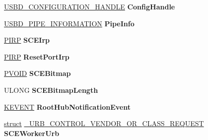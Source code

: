 \begin{DoxyCompactItemize}
\item 
\mbox{\label{struct___u_s_b_h_u_b___f_d_o___e_x_t_e_n_s_i_o_n_ab1c0ac7dc7bae4de4aabdfe5ae3b74e1}} 
\hyperlink{interfacevoid}{U\+S\+B\+D\+\_\+\+C\+O\+N\+F\+I\+G\+U\+R\+A\+T\+I\+O\+N\+\_\+\+H\+A\+N\+D\+LE} {\bfseries Config\+Handle}
\item 
\mbox{\label{struct___u_s_b_h_u_b___f_d_o___e_x_t_e_n_s_i_o_n_af53e676fd79ab3e45ddbbae993cc10d7}} 
\hyperlink{struct___u_s_b_d___p_i_p_e___i_n_f_o_r_m_a_t_i_o_n}{U\+S\+B\+D\+\_\+\+P\+I\+P\+E\+\_\+\+I\+N\+F\+O\+R\+M\+A\+T\+I\+ON} {\bfseries Pipe\+Info}
\item 
\mbox{\label{struct___u_s_b_h_u_b___f_d_o___e_x_t_e_n_s_i_o_n_a0b889f7984f1a51833e6a92f00398e81}} 
\hyperlink{interfacevoid}{P\+I\+RP} {\bfseries S\+C\+E\+Irp}
\item 
\mbox{\label{struct___u_s_b_h_u_b___f_d_o___e_x_t_e_n_s_i_o_n_abdd2cebbe3e6877b25b33815d009ee9e}} 
\hyperlink{interfacevoid}{P\+I\+RP} {\bfseries Reset\+Port\+Irp}
\item 
\mbox{\label{struct___u_s_b_h_u_b___f_d_o___e_x_t_e_n_s_i_o_n_aa9657367e0665ffd4ce06adcbb2d1fd1}} 
\hyperlink{interfacevoid}{P\+V\+O\+ID} {\bfseries S\+C\+E\+Bitmap}
\item 
\mbox{\label{struct___u_s_b_h_u_b___f_d_o___e_x_t_e_n_s_i_o_n_ac735c38c6d764ec220df893c1cd31bb6}} 
U\+L\+O\+NG {\bfseries S\+C\+E\+Bitmap\+Length}
\item 
\mbox{\label{struct___u_s_b_h_u_b___f_d_o___e_x_t_e_n_s_i_o_n_a88bf88f8cf9718a0e8f805a0914ad21b}} 
\hyperlink{struct___k_e_v_e_n_t}{K\+E\+V\+E\+NT} {\bfseries Root\+Hub\+Notification\+Event}
\item 
\mbox{\label{struct___u_s_b_h_u_b___f_d_o___e_x_t_e_n_s_i_o_n_ad9711c99b6b78330c27751d9f872d7d7}} 
\hyperlink{interfacestruct}{struct} \hyperlink{struct___u_r_b___c_o_n_t_r_o_l___v_e_n_d_o_r___o_r___c_l_a_s_s___r_e_q_u_e_s_t}{\+\_\+\+U\+R\+B\+\_\+\+C\+O\+N\+T\+R\+O\+L\+\_\+\+V\+E\+N\+D\+O\+R\+\_\+\+O\+R\+\_\+\+C\+L\+A\+S\+S\+\_\+\+R\+E\+Q\+U\+E\+ST} {\bfseries S\+C\+E\+Worker\+Urb}

\end{DoxyCompactItemize}
